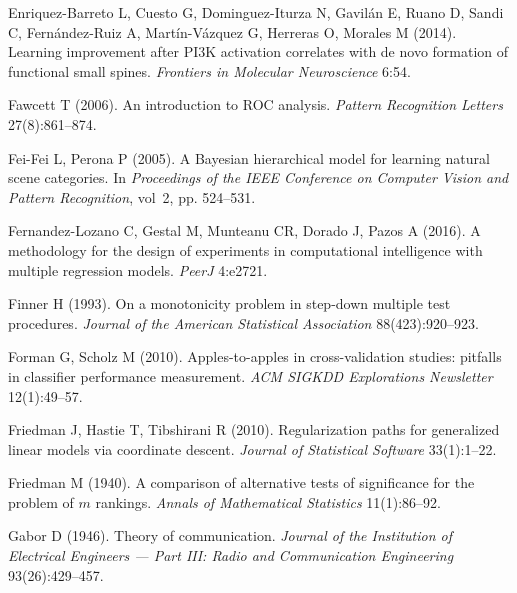 \begin{thebibliography}{110}
Enriquez-Barreto L, Cuesto G, Dominguez-Iturza N, Gavil{\'a}n E, Ruano D, Sandi
  C, Fern{\'a}ndez-Ruiz A, Mart{\'i}n-V{\'a}zquez G, Herreras O, Morales M
  (2014). Learning improvement after {PI3K} activation correlates with de novo
  formation of functional small spines. \emph{Frontiers in Molecular
  Neuroscience} 6:54.

Fawcett T (2006). An introduction to {ROC} analysis. \emph{Pattern Recognition
  Letters} 27(8):861--874.

{\color{red}Fei-Fei L, Perona P (2005). A {B}ayesian hierarchical model for learning
  natural scene categories. In \emph{Proceedings of the IEEE Conference on
  Computer Vision and Pattern Recognition}, vol~2, pp. 524--531.}

Fernandez-Lozano C, Gestal M, Munteanu CR, Dorado J, Pazos A (2016). A
  methodology for the design of experiments in computational intelligence with
  multiple regression models. \emph{PeerJ} 4:e2721.

{\color{red}Finner H (1993). On a monotonicity problem in step-down multiple test
  procedures. \emph{Journal of the American Statistical Association}
  88(423):920--923.}

Forman G, Scholz M (2010). Apples-to-apples in cross-validation studies:
  pitfalls in classifier performance measurement. \emph{ACM SIGKDD Explorations
  Newsletter} 12(1):49--57.

Friedman J, Hastie T, Tibshirani R (2010). Regularization paths for generalized
  linear models via coordinate descent. \emph{Journal of Statistical Software}
  33(1):1--22.

Friedman M (1940). A comparison of alternative tests of significance for the
  problem of $m$ rankings. \emph{Annals of Mathematical Statistics}
  11(1):86--92.

Gabor D (1946). Theory of communication. \emph{Journal of the Institution of
  Electrical Engineers --- Part III: Radio and Communication Engineering}
  93(26):429--457.


\end{thebibliography}

